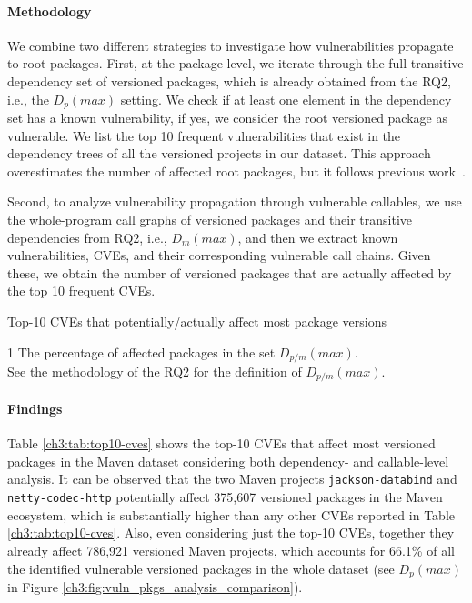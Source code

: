 \paragraph{Methodology}
We combine two different strategies to investigate how vulnerabilities propagate to root packages.
First, at the package level, we iterate through the full transitive dependency set of versioned packages, which is already obtained from the RQ2, i.e., the $D_{p}(max)$ setting.
We check if at least one element in the dependency set has a known vulnerability, if yes, we consider the root versioned package as vulnerable.
We list the top 10 frequent vulnerabilities that exist in the dependency trees of all the versioned projects in our dataset.
This approach overestimates the number of affected root packages, but it follows previous work~\cite{liu2022demystifying}.

Second, to analyze vulnerability propagation through vulnerable callables, we use the whole-program call graphs of versioned packages and their transitive dependencies from RQ2, i.e., $D_{m}(max)$, and then we extract known vulnerabilities, CVEs, and their corresponding vulnerable call chains.
Given these, we obtain the number of versioned packages that are actually affected by the top 10 frequent CVEs.

\begin{table}
    \centering
    \caption{Top-10 CVEs that potentially/actually affect most package versions}
    \label{ch3:tab:top10-cves}
    \begin{threeparttable}
    
    \begin{tablenotes}
    \item[1] {\footnotesize
    The percentage of affected packages in the set $D_{p/m}(max)$. \\ See the methodology of the RQ2 for the definition of $D_{p/m}(max)$.}
  \end{tablenotes}
\end{threeparttable}
\end{table}

\paragraph{Findings}
Table \ref{ch3:tab:top10-cves} shows the top-10 CVEs that affect most versioned packages in the Maven dataset considering both dependency- and callable-level analysis.
It can be observed that the two Maven projects \texttt{jackson-databind} and \texttt{netty-codec-http} potentially affect 375,607 versioned packages in the Maven ecosystem, which is substantially higher than any other CVEs reported in Table \ref{ch3:tab:top10-cves}.
Also, even considering just the top-10 CVEs, together they already affect 786,921 versioned Maven projects, which accounts for 66.1\% of all the identified vulnerable versioned packages in the whole dataset (see $D_p(max)$ in Figure \ref{ch3:fig:vuln_pkgs_analysis_comparison}).

